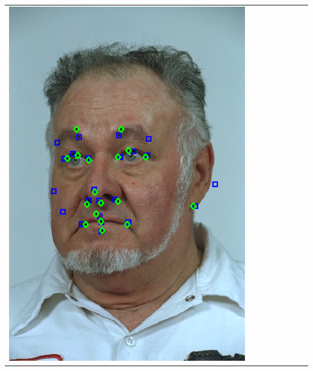 \documentclass[landscape,final,a0paper,fontscale=0.27065]{baposter}
\begin{document}
\begin{poster}
{{\begin{tabular}{@{}rccccccc@{}}
 \parbox[c]{0.11\linewidth}{\includegraphics[width=\linewidth]{images/l_ql_success_1.pdf}} &

\end{tabular}}}
\end{poster}
\end{document}
